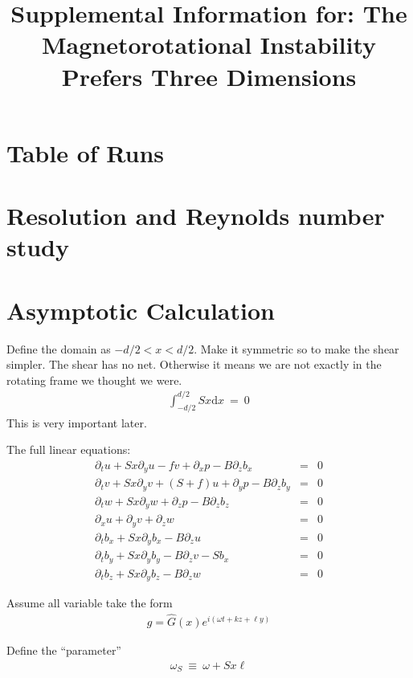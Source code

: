 \documentclass[aps,prl,preprint
,superscriptaddress]{revtex4-1}\newcommand{\SSC}{S/S_{c}}
\newcommand\Beq{\begin{eqnarray}}
\newcommand\Eeq{\end{eqnarray}}
\newcommand{\pd}[1]{\partial_{#1}}
\begin{document}

\title{Supplemental Information for: The Magnetorotational Instability Prefers Three Dimensions}

\section{Table of Runs}
\label{sec:runs}

\section{Resolution and Reynolds number study}
\label{sec:resolution}

\section{Asymptotic Calculation}
\label{sec:asymp}
Define the domain as $ - d/2 < x < d/2$. Make it symmetric so to make the shear simpler. The shear has no net. Otherwise it means we are not exactly in the rotating frame we thought we were. 
\Beq
\int_{-d/2}^{d/2} S x \text{d} x  \ = \ 0
\Eeq
This is very important later. 

The full linear equations:
\Beq
\pd{t} u + S x \pd{y} u - f v + \pd{x} p - B \pd{z} b_{x} &=& 0\\
\pd{t} v + S x \pd{y} v + (S+f) u + \pd{y} p - B \pd{z} b_{y} &=& 0\\
\pd{t} w + S x \pd{y} w + \pd{z} p - B \pd{z} b_{z} &=& 0 \\
\pd{x} u + \pd{y} v + \pd{z} w  &=& 0\\
\pd{t} b_{x} + S x \pd{y} b_{x} - B \pd{z} u &=& 0\\
\pd{t} b_{y} + S x \pd{y} b_{y} - B \pd{z} v - S b_{x}  &=& 0\\
\pd{t} b_{z} + S x \pd{y} b_{z} - B \pd{z} w &=& 0
\Eeq

Assume all variable take the form
\Beq
g = \hat{G}(x) e^{ i ( \omega t + k z + \ell y ) } 
\Eeq

Define the ``parameter''
\Beq
\omega_{S} \ \equiv \ \omega + S x \ell 
\Eeq
\end{document}
